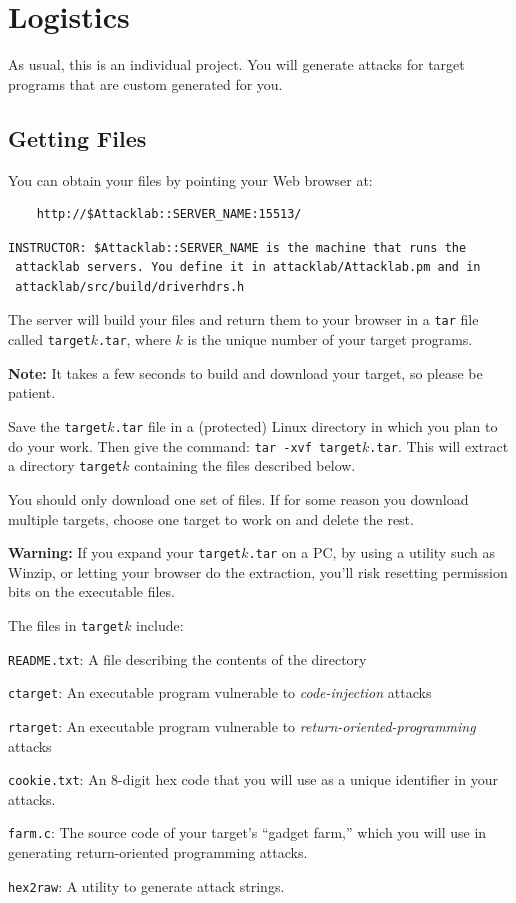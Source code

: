 \documentclass[11pt]{article}
\begin{document}
\section{Logistics}

As usual, this is an individual project.  You will generate attacks
for target programs that are custom generated for you.  

\subsection{Getting Files}

You can obtain your files by pointing your Web browser at:

\begin{verbatim}
    http://$Attacklab::SERVER_NAME:15513/
\end{verbatim}

\begin{verbatim}
INSTRUCTOR: $Attacklab::SERVER_NAME is the machine that runs the
 attacklab servers. You define it in attacklab/Attacklab.pm and in
 attacklab/src/build/driverhdrs.h
\end{verbatim}

The server will build your files and return them to your browser in a
\texttt{tar} file called \texttt{target}$k$\texttt{.tar}, where $k$ is the unique
number of your target programs.

{\bf Note:} It takes a few seconds to build and download your target, so please be patient. 

Save the \texttt{target}$k$\texttt{.tar} file in a (protected) Linux
directory in which you plan to do your work.  Then give the command:
\texttt{tar~-xvf target}$k$\texttt{.tar}.  This will extract a
directory {\tt target}$k$ containing the files described below.

You should only download one set of files. If for some reason you download multiple
targets, choose one target to work on and delete the rest.

{\bf Warning:} If you expand your \texttt{target}$k$\texttt{.tar} on a
PC, by using a utility such as Winzip, or letting your browser do the
extraction, you'll risk resetting permission bits on the executable
files.  

The files in {\tt target}$k$ include:
\begin{description}
\item{\tt README.txt}: A file describing the contents of the directory
\item{\tt ctarget}: An executable program vulnerable to {\em code-injection}
  attacks
\item{\tt rtarget}: An executable program vulnerable to {\em
  return-oriented-programming} attacks
\item{\tt cookie.txt}: An 8-digit hex code that you will use as a
  unique identifier in your attacks.
\item {\tt farm.c}: The source code of your target's ``gadget farm,''
which you will use in generating return-oriented programming attacks.
\item {\tt hex2raw}: A utility to generate attack strings.
\end{description}
\end{document}
